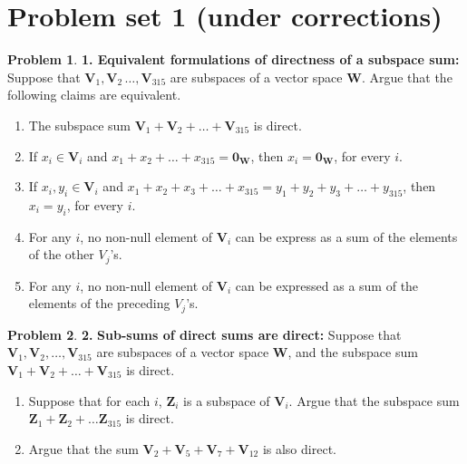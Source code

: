 \documentclass{book}
\theoremstyle{definition}
\newtheorem*{prob*}{Problem}
\newcommand{\V}{\mathbf{V}}
\newcommand{\W}{\mathbf{W}}
\newcommand{\Z}{\mathbf{Z}}
\begin{document}
\section{Problem set 1 (under corrections)}
\begin{prob*} \textbf{1. Equivalent formulations of directness of a subspace sum:} Suppose that $\V_1, \V_2\,\dots,\V_{315}$ are subspaces of a vector space $\W$. Argue that the following claims are equivalent. 
	\begin{enumerate}
		\item The subspace sum $\V_1 + \V_2 + \dots + \V_{315}$ is direct. 
		\item If $x_i \in \V_i$ and $x_1 + x_2 + \dots + x_{315} = \mathbf{0}_\W$, then $x_i = \mathbf{0}_\W$, for every $i$.
		\item If $x_i, y_i \in \V_i$ and $x_1 + x_2 + x_3 + \dots + x_{315} = y_1 + y_2 + y_3 + \dots + y_{315}$, then $x_i = y_i$, for every $i$.
		\item For any $i$, no non-null element of $\V_i$ can be express as a sum of the elements of the other $V_j$'s.
		\item For any $i$, no non-null element of $\V_i$ can be expressed as a sum of the elements of the preceding $V_j$'s. 
	\end{enumerate}

\end{prob*}


\newpage

\begin{prob*} \textbf{2.} \textbf{Sub-sums of direct sums are direct: }
	Suppose that $\V_1, \V_2,\dots, \V_{315}$ are subspaces of a vector space $\W$, and the subspace sum $\V_1+\V_2+\dots+\V_{315}$ is direct.
	\begin{enumerate}
		\item Suppose that for each $i$, $\Z_i$ is a subspace of $\V_i$. Argue that the subspace sum $\Z_1 + \Z_2 + \dots \Z_{315}$ is direct. 
		\item Argue that the sum $\V_2 + \V_5 + \V_7 + \V_{12}$ is also direct. 
	\end{enumerate}

\end{prob*}


\newpage
\end{document}
